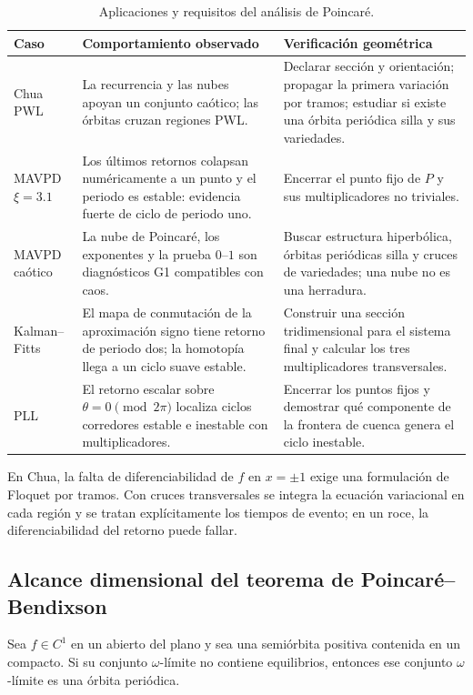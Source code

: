 \begin{table}[H]
\centering
\caption{Aplicaciones y requisitos del análisis de Poincaré.}
\label{geo:tab:poincare-cases}
\small
\begin{tabularx}{\textwidth}{@{}L{0.17\textwidth}YY@{}}
\toprule
Caso & Comportamiento observado & Verificación geométrica \\
\midrule
Chua PWL & La recurrencia y las nubes apoyan un conjunto caótico; las órbitas
cruzan regiones PWL. & Declarar sección y orientación; propagar la primera
variación por tramos; estudiar si existe una órbita periódica silla y sus
variedades. \\
MAVPD \(\xi=3.1\) & Los últimos retornos colapsan numéricamente a un punto y el
periodo es estable: evidencia fuerte de ciclo de periodo uno. & Encerrar el
punto fijo de \(P\) y sus multiplicadores no triviales. \\
MAVPD caótico & La nube de Poincaré, los exponentes y la prueba \(0\)--\(1\)
son diagnósticos G1 compatibles con caos. & Buscar estructura hiperbólica,
órbitas periódicas silla y cruces de variedades; una nube no es una herradura.
\\
Kalman--Fitts & El mapa de conmutación de la aproximación signo tiene retorno
de periodo dos; la homotopía llega a un ciclo suave estable. & Construir una
sección tridimensional para el sistema final y calcular los tres
multiplicadores transversales. \\
PLL & El retorno escalar sobre \(\theta=0\pmod{2\pi}\) localiza ciclos
corredores estable e inestable con multiplicadores. & Encerrar los puntos
fijos y demostrar qué componente de la frontera de cuenca genera el ciclo
inestable. \\
\bottomrule
\end{tabularx}
\end{table}

En Chua, la falta de diferenciabilidad de \(f\) en \(x=\pm1\) exige una
formulación de Floquet por tramos. Con cruces transversales
se integra la ecuación variacional en cada región y se tratan explícitamente
los tiempos de evento; en un roce, la diferenciabilidad del retorno puede
fallar.

\subsection{Alcance dimensional del teorema de Poincaré--Bendixson}

\begin{proposition}
Sea \(f\in C^1\) en un abierto del plano y sea una semiórbita positiva
contenida en un compacto. Si su conjunto \(\omega\)-límite no contiene
equilibrios, entonces ese conjunto \(\omega\)-límite es una órbita periódica.
\end{proposition}


